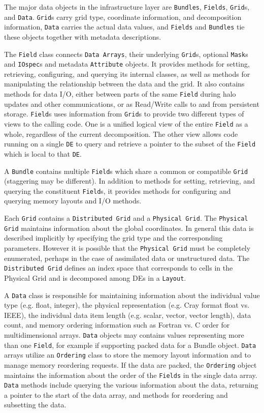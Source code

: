 The major data objects in the infrastructure layer are {\tt Bundles},
{\tt Fields}, {\tt Grid}s, and {\tt Data}.
{\tt Grid}s carry grid type, coordinate information,
and decomposition information, {\tt Data} carries the actual
data values, and {\tt Fields} and {\tt Bundles} tie these objects 
together with metadata descriptions.

The {\tt Field} class connects {\tt Data Arrays}, their underlying
{\tt Grid}s, optional {\tt Mask}s and {\tt IOspec}s and metadata 
{\tt Attribute} objects.  It provides methods
for setting, retrieving, configuring, and querying its internal classes,
as well as methods for manipulating the relationship between the
data and the grid.  It also contains methods for data I/O, either
between parts of the same {\tt Field} during halo updates and other
communications, or as 
Read/Write calls to and from persistent storage.
{\tt Field}s uses information from {\tt Grid}s to provide
two different types of views to the calling code.
One is a unified logical view of the entire {\tt Field} as a whole,
regardless of the current decomposition.  The other view allows code
running on a single {\tt DE} to query and retrieve a pointer 
to the subset of the {\tt Field} which is local to that {\tt DE}.

A {\tt Bundle} contains multiple {\tt Field}s which share a
common or compatible {\tt Grid} (staggering may be different).  In 
addition to methods for
setting, retrieving, and querying the constituent {\tt Field}s, it provides
methods for configuring and querying memory layouts and I/O methods.

Each {\tt Grid} contains a {\tt Distributed Grid} and a 
{\tt Physical Grid}.  The {\tt Physical Grid} maintains
information about the global coordinates.  In general this data
is described implicitly by specifying the grid type and the
corresponding parameters.  However it is possible that the
{\tt Physical Grid} must be completely enumerated, perhaps in the
case of assimilated data or unstructured data.
The {\tt Distributed Grid} defines an index space that corresponds to
cells in the Physical Grid and is decomposed among {DE}s in a 
{\tt Layout}.  

A {\tt Data} class is responsible for maintaining
information about the individual value type (e.g. float, integer), 
the physical representation (e.g. Cray format float vs. IEEE), the 
individual data item length (e.g. scalar, vector, vector length), 
data count, and memory ordering information such as Fortran vs. C order 
for multidimensional arrays.  {\tt Data} objects may contains values 
representing more than one {\tt Field}, for example if supporting
packed data for a Bundle object.
{\tt Data} arrays utilize an {\tt Ordering} class to store the
memory layout information and to manage memory reordering requests.
If the data are packed, the {\tt Ordering} object maintains the information
about the order of the {\tt Fields} in the single data array.
{\tt Data} methods include querying the various information about the
data, returning a pointer to the start of the data
array, and methods for reordering and subsetting the data.

